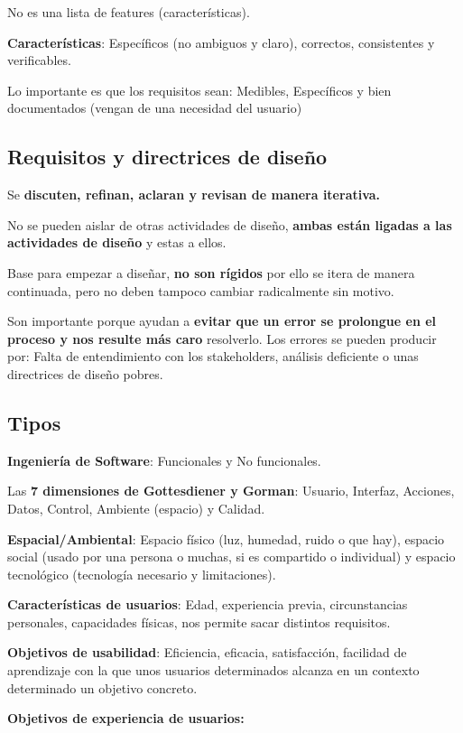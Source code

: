 \documentclass[12pt]{report} %
\begin{document}
No es una lista de features (características).

\textbf{Características}: Específicos (no ambiguos y claro), correctos,
consistentes y verificables.

Lo importante es que los requisitos sean: Medibles, Específicos y bien documentados (vengan de una necesidad del usuario)

\subsection{Requisitos y directrices de diseño}

Se \textbf{discuten, refinan, aclaran y revisan de manera iterativa.}

No se pueden aislar de otras actividades de diseño, \textbf{ambas están
ligadas a las actividades de diseño} y estas a ellos.

Base para empezar a diseñar, \textbf{no son rígidos} por ello se itera
de manera continuada, pero no deben tampoco cambiar radicalmente sin
motivo.

Son importante porque ayudan a \textbf{evitar que un error se prolongue
en el proceso y nos resulte más caro} resolverlo. Los errores se pueden
producir por: Falta de entendimiento con los stakeholders, análisis
deficiente o unas directrices de diseño pobres.

\subsection{Tipos}

\textbf{Ingeniería de Software}: Funcionales y No funcionales.

Las \textbf{7 dimensiones de Gottesdiener y Gorman}: Usuario, Interfaz,
Acciones, Datos, Control, Ambiente (espacio) y Calidad.

\textbf{Espacial/Ambiental}: Espacio físico (luz, humedad, ruido o que
hay), espacio social (usado por una persona o muchas, si es compartido o
individual) y espacio tecnológico (tecnología necesario y limitaciones).

\textbf{Características de usuarios}: Edad, experiencia previa,
circunstancias personales, capacidades físicas, nos permite sacar
distintos requisitos.

\textbf{Objetivos de usabilidad}: Eficiencia, eficacia, satisfacción,
facilidad de aprendizaje con la que unos usuarios determinados alcanza en
un contexto determinado un objetivo concreto.

\textbf{Objetivos de experiencia de usuarios:}
\end{document}
